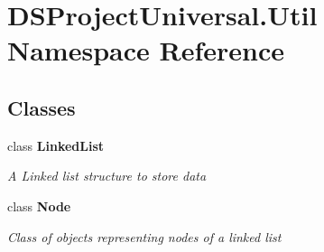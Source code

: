 \section{D\+S\+Project\+Universal.\+Util Namespace Reference}
\label{namespace_d_s_project_universal_1_1_util}
\subsection*{Classes}
\begin{DoxyCompactItemize}
\item 
class \textbf{ Linked\+List}
\begin{DoxyCompactList}\small\item\em A Linked list structure to store data\end{DoxyCompactList}\item 
class \textbf{ Node}
\begin{DoxyCompactList}\small\item\em Class of objects representing nodes of a linked list\end{DoxyCompactList}\end{DoxyCompactItemize}
